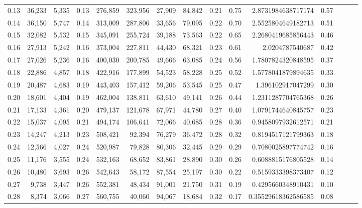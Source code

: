 \begin{tabular}{rrrrrrrrrrrrrrr}
0.13 &  36,233 &  5,335 &  0.13 &  276,859 &  323,956 &   27,909 &   84,842 &  0.21 &  0.75 &      2.8731984638717174 &      0.57 \\
0.14 &  36,150 &  5,747 &  0.14 &  313,009 &  287,806 &   33,656 &   79,095 &  0.22 &  0.70 &      2.5525804649182713 &      0.51 \\
0.15 &  32,082 &  5,532 &  0.15 &  345,091 &  255,724 &   39,188 &   73,563 &  0.22 &  0.65 &      2.2680419685856443 &      0.46 \\
0.16 &  27,913 &  5,242 &  0.16 &  373,004 &  227,811 &   44,430 &   68,321 &  0.23 &  0.61 &         2.0204787540687 &      0.42 \\
0.17 &  27,026 &  5,236 &  0.16 &  400,030 &  200,785 &   49,666 &   63,085 &  0.24 &  0.56 &      1.7807824320848595 &      0.37 \\
0.18 &  22,886 &  4,857 &  0.18 &  422,916 &  177,899 &   54,523 &   58,228 &  0.25 &  0.52 &      1.5778041879894635 &      0.33 \\
0.19 &  20,487 &  4,683 &  0.19 &  443,403 &  157,412 &   59,206 &   53,545 &  0.25 &  0.47 &       1.396102917047299 &      0.30 \\
0.20 &  18,601 &  4,404 &  0.19 &  462,004 &  138,811 &   63,610 &   49,141 &  0.26 &  0.44 &      1.2311287704765368 &      0.26 \\
0.21 &  17,133 &  4,361 &  0.20 &  479,137 &  121,678 &   67,971 &   44,780 &  0.27 &  0.40 &      1.0791744640845757 &      0.23 \\
0.22 &  15,037 &  4,095 &  0.21 &  494,174 &  106,641 &   72,066 &   40,685 &  0.28 &  0.36 &      0.9458097932612571 &      0.21 \\
0.23 &  14,247 &  4,213 &  0.23 &  508,421 &   92,394 &   76,279 &   36,472 &  0.28 &  0.32 &      0.8194517121799363 &      0.18 \\
0.24 &  12,566 &  4,027 &  0.24 &  520,987 &   79,828 &   80,306 &   32,445 &  0.29 &  0.29 &      0.7080025897774742 &      0.16 \\
0.25 &  11,176 &  3,555 &  0.24 &  532,163 &   68,652 &   83,861 &   28,890 &  0.30 &  0.26 &      0.6088815176805528 &      0.14 \\
0.26 &  10,480 &  3,693 &  0.26 &  542,643 &   58,172 &   87,554 &   25,197 &  0.30 &  0.22 &      0.5159333398373407 &      0.12 \\
0.27 &   9,738 &  3,447 &  0.26 &  552,381 &   48,434 &   91,001 &   21,750 &  0.31 &  0.19 &      0.4295660348910431 &      0.10 \\
0.28 &   8,374 &  3,066 &  0.27 &  560,755 &   40,060 &   94,067 &   18,684 &  0.32 &  0.17 &     0.35529618362586585 &      0.08 \\

\end{tabular}
